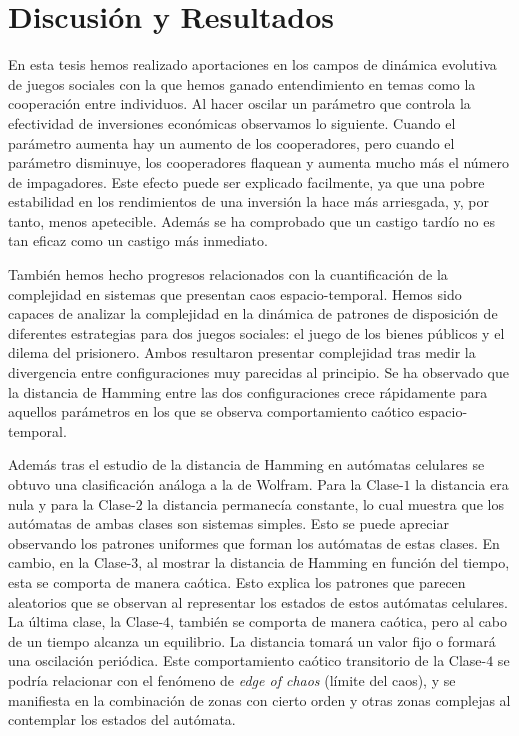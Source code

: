 \section{Discusión y Resultados}

En esta tesis hemos realizado aportaciones en los campos de dinámica evolutiva de juegos sociales con la que hemos ganado entendimiento en temas como la cooperación entre individuos. Al hacer oscilar un parámetro que controla la efectividad de inversiones económicas observamos lo siguiente. Cuando el parámetro aumenta hay un aumento de los cooperadores, pero cuando el parámetro disminuye, los cooperadores flaquean y aumenta mucho más el número de impagadores. Este efecto puede ser explicado facilmente, ya que una pobre estabilidad en los rendimientos de una inversión la hace más arriesgada, y, por tanto, menos apetecible. Además se ha comprobado que un castigo tardío no es tan eficaz como un castigo más inmediato.

También hemos hecho progresos relacionados con la cuantificación de la complejidad en sistemas que presentan caos espacio-temporal. Hemos sido capaces de analizar la complejidad en la dinámica de patrones de disposición de diferentes estrategias para dos juegos sociales: el juego de los bienes públicos y el dilema del prisionero. Ambos resultaron presentar complejidad tras medir la divergencia entre configuraciones muy parecidas al principio. Se ha observado que la distancia de Hamming entre las dos configuraciones crece rápidamente para aquellos parámetros en los que se observa comportamiento caótico espacio-temporal.

Además tras el estudio de la distancia de Hamming en autómatas celulares se obtuvo una clasificación análoga a la de Wolfram. Para la Clase-$1$ la distancia era nula y para la Clase-$2$ la distancia permanecía constante, lo cual muestra que los autómatas de ambas clases son sistemas simples. Esto se puede apreciar observando los patrones uniformes que forman los autómatas de estas clases. En cambio, en la Clase-$3$, al mostrar la distancia de Hamming en función del tiempo, esta se comporta de manera caótica. Esto explica los patrones que parecen aleatorios que se observan al representar los estados de estos autómatas celulares. La última clase, la Clase-$4$, también se comporta de manera caótica, pero al cabo de un tiempo alcanza un equilibrio. La distancia tomará un valor fijo o formará una oscilación periódica. Este comportamiento caótico transitorio de la Clase-$4$ se podría relacionar con el fenómeno de \textit{edge of chaos} (límite del caos), y se manifiesta en la combinación de zonas con cierto orden y otras zonas complejas al contemplar los estados del autómata.


